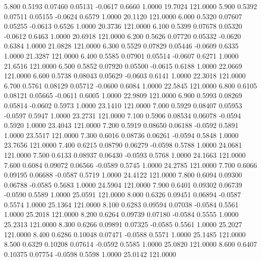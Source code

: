    5.800   0.5193   0.07460   0.05131  -0.0617   0.6660   1.0000  19.7024 121.0000
   5.900   0.5392   0.07511   0.05155  -0.0624   0.6579   1.0000  20.1120 121.0000
   6.000   0.5320   0.07607   0.05255  -0.0613   0.6526   1.0000  20.3736 121.0000
   6.100   0.5399   0.07678   0.05320  -0.0612   0.6463   1.0000  20.6918 121.0000
   6.200   0.5626   0.07720   0.05332  -0.0620   0.6384   1.0000  21.0828 121.0000
   6.300   0.5529   0.07829   0.05446  -0.0609   0.6335   1.0000  21.3287 121.0000
   6.400   0.5585   0.07901   0.05514  -0.0607   0.6271   1.0000  21.6516 121.0000
   6.500   0.5852   0.07920   0.05500  -0.0615   0.6188   1.0000  22.0669 121.0000
   6.600   0.5738   0.08043   0.05629  -0.0603   0.6141   1.0000  22.3018 121.0000
   6.700   0.5761   0.08129   0.05712  -0.0600   0.6084   1.0000  22.5845 121.0000
   6.800   0.6105   0.08121   0.05665  -0.0611   0.6005   1.0000  22.9809 121.0000
   6.900   0.5993   0.08269   0.05814  -0.0602   0.5973   1.0000  23.1410 121.0000
   7.000   0.5929   0.08407   0.05953  -0.0597   0.5947   1.0000  23.2731 121.0000
   7.100   0.5906   0.08534   0.06078  -0.0594   0.5920   1.0000  23.4043 121.0000
   7.200   0.5919   0.08650   0.06188  -0.0592   0.5891   1.0000  23.5517 121.0000
   7.300   0.6016   0.08736   0.06261  -0.0594   0.5848   1.0000  23.7656 121.0000
   7.400   0.6215   0.08790   0.06279  -0.0598   0.5788   1.0000  24.0681 121.0000
   7.500   0.6133   0.08937   0.06430  -0.0593   0.5768   1.0000  24.1663 121.0000
   7.600   0.6084   0.09072   0.06566  -0.0589   0.5745   1.0000  24.2785 121.0000
   7.700   0.6066   0.09195   0.06688  -0.0587   0.5719   1.0000  24.4122 121.0000
   7.800   0.6094   0.09300   0.06788  -0.0585   0.5683   1.0000  24.5904 121.0000
   7.900   0.6401   0.09302   0.06739  -0.0590   0.5589   1.0000  25.0591 121.0000
   8.000   0.6326   0.09451   0.06894  -0.0587   0.5574   1.0000  25.1364 121.0000
   8.100   0.6283   0.09594   0.07038  -0.0584   0.5561   1.0000  25.2018 121.0000
   8.200   0.6264   0.09739   0.07180  -0.0584   0.5555   1.0000  25.2313 121.0000
   8.300   0.6266   0.09891   0.07325  -0.0585   0.5561   1.0000  25.2027 121.0000
   8.400   0.6286   0.10048   0.07471  -0.0588   0.5571   1.0000  25.1485 121.0000
   8.500   0.6329   0.10208   0.07614  -0.0592   0.5585   1.0000  25.0820 121.0000
   8.600   0.6407   0.10375   0.07754  -0.0598   0.5598   1.0000  25.0142 121.0000
